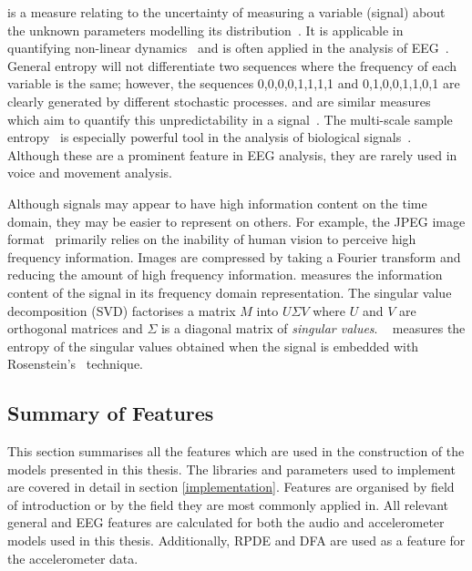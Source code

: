 \documentclass[12pt, twoside]{book}
\renewcommand\emph[1]{\textit{\color{USred}{#1}}}
\begin{document}
\emph{Fisher Information} is a measure relating to the uncertainty of measuring a variable (signal) about the unknown parameters modelling its distribution~\cite{fisherentropy}. It is applicable in quantifying non-linear dynamics~\cite{fisherinfo} and is often applied in the analysis of EEG~\cite{martin1999fisherinfoeeg}. General entropy will not differentiate two sequences where the frequency of each variable is the same; however, the sequences 0,0,0,0,1,1,1,1 and 0,1,0,0,1,1,0,1 are clearly generated by different stochastic processes. \emph{Approximate} and \emph{sample entropy} are similar measures which aim to quantify this unpredictability in a signal~\cite{apsampentropy, apentropy}. The multi-scale sample entropy~\cite{multiscaleentropy} is especially powerful tool in the analysis of biological signals~\cite{samplegaitmulti, sampleheart}. Although these are a prominent feature in EEG analysis, they are rarely used in voice and movement analysis. 

Although signals may appear to have high information content on the time domain, they may be easier to represent on others. For example, the JPEG image format~\cite{jpeg} primarily relies on the inability of human vision to perceive high frequency information. Images are compressed by taking a Fourier transform and reducing the amount of high frequency information. \emph{Spectral entropy} measures the information content of the signal in its frequency domain representation. The singular value decomposition (SVD) factorises a matrix $M$ into $U\Sigma V$ where $U$ and $V$ are orthogonal matrices and $\Sigma$ is a diagonal matrix of \textit{singular values}.  \emph{SVD entropy}~\cite{svdentropy} measures the entropy of the singular values obtained when the signal is embedded with Rosenstein's~\cite{rosenstein1993practicallyapunov} technique. 



\subsection{Summary of Features}
This section summarises all the features which are used in the construction of the models presented in this thesis. The libraries and parameters used to implement are covered in detail in section \ref{implementation}. Features are organised by field of introduction or by the field they are most commonly applied in. All relevant general and EEG features are calculated for both the audio and accelerometer models used in this thesis. Additionally, RPDE and DFA are used as a feature for the accelerometer data.
\end{document}
